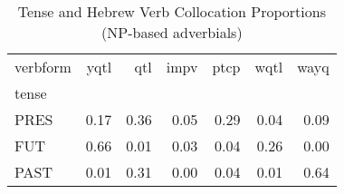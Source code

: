 \begin{table}[htbp!]
\centering
\caption{Tense and Hebrew Verb Collocation Proportions (NP-based adverbials)}
\label{table:np_tense_pr}
\begin{tabular}{lrrrrrr}
\toprule
verbform &  yqtl &   qtl &  impv &  ptcp &  wqtl &  wayq \\
tense &       &       &       &       &       &       \\
\midrule
PRES  &  0.17 &  0.36 &  0.05 &  0.29 &  0.04 &  0.09 \\
FUT   &  0.66 &  0.01 &  0.03 &  0.04 &  0.26 &  0.00 \\
PAST  &  0.01 &  0.31 &  0.00 &  0.04 &  0.01 &  0.64 \\
\bottomrule
\end{tabular}
\end{table}
